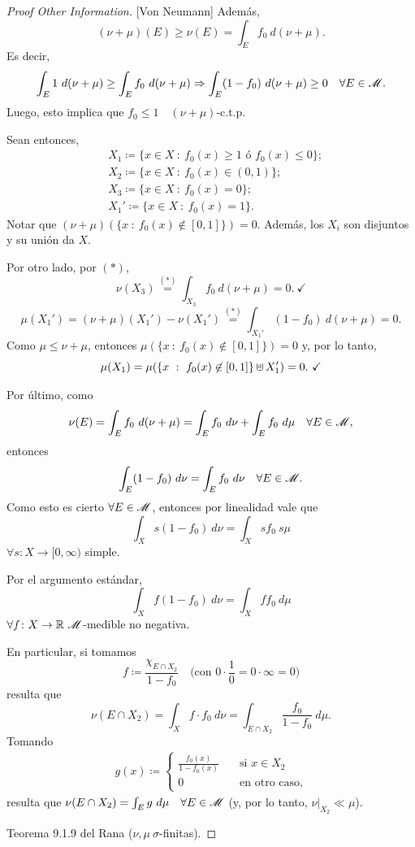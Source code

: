 \begin{proof}[Proof Other Information][Von Neumann]
	Además, 
	\[ (\nu + \mu)(E) \geq \nu(E) = \int_{E} f_{0} \ d(\nu + \mu). \]
	Es decir,
	\[ \int_{E} 1 \ d(\nu + \mu) \geq \int_{E} f_{0} \ d(\nu + \mu) \Rightarrow \int_{E} (1 - f_{0}) \ d(\nu + \mu) \geq 0 \quad \forall E \in \mathscr{M}. \]
	Luego, esto implica que $f_{0} \leq 1 \quad (\nu + \mu)$-c.t.p. \par
	Sean entonces, 
	\begin{align*}
		& X_{1} \coloneq \{x \in X \ : \ f_{0}(x) \geq 1 \text{ ó } f_{0}(x) \leq 0\}; \\
		& X_{2} \coloneq \{x \in X \ : \ f_{0}(x) \in (0,1)\}; \\
		& X_{3} \coloneq \{x \in X \ : \ f_{0}(x) = 0\}; \\
		& X_{1}' \coloneq \{x \in X \ : \ f_{0}(x) = 1\}  
	.\end{align*}
	Notar que $(\nu + \mu)(\{x \ : \ f_{0}(x) \not\in [0,1]\}) = 0$. Además, los $X_{i}$ son disjuntos y su unión da $X$. \par
	Por otro lado, por $(*)$,
	\[ \nu(X_{3}) \stackrel{(*)}{=} \int_{X_{3}} f_{0} \ d(\nu + \mu) = 0. \ \checkmark \]
	\[ \mu(X_{1}') = (\nu + \mu)(X_{1}') - \nu(X_{1}') \stackrel{(*)}{=} \int_{X_{1}'} (1 - f_{0}) \ d(\nu + \mu) = 0. \]
	Como $\mu \leq \nu + \mu$, entonces $\mu(\{x \ : \ f_{0}(x) \not\in [0,1]\}) = 0$ y, por lo tanto,
	\[ \mu(X_{1}) = \mu(\{x \ : \ f_{0}(x) \not\in [0,1]\} \cupd X_{1}') = 0. \ \checkmark \] 
	\par
	Por último, como
	\[ \nu(E) = \int_{E} f_{0} \ d(\nu + \mu) = \int_{E} f_{0} \ d\nu + \int_{E} f_{0} \ d\mu \quad \forall E \in \mathscr{M}, \]
	entonces
	\[ \int_{E} (1 - f_{0}) \ d\nu = \int_{E} f_{0} \ d\nu \quad \forall E \in \mscr{M}. \]
	Como esto es cierto $\forall E \in \mathscr{M}$, entonces por linealidad vale que
	\[ \int_{X} s(1 - f_{0}) \ d\nu = \int_{X} sf_{0} \ s\mu \]
	$\forall s \colon X \to [0,\infty)$ simple. \par
	Por el argumento estándar,
	\[ \int_{X} f(1 - f_{0}) \ d\nu = \int_{X} f f_{0} \ d\mu \]
	$\forall f \colon X \to \R \ \mscr{M}$-medible no negativa. \par
	En particular, si tomamos
	\[ f \coloneq \frac{\chi_{E \cap X_{2}}}{1 - f_{0}} \quad \Big(\text{con } 0 \cdot \frac{1}{0} = 0 \cdot \infty = 0 \Big) \]
	resulta que
	\[ \nu(E \cap X_{2}) = \int_{X} f \cdot f_{0} \ d\nu = \int_{E \cap X_{2}} \frac{f_{0}}{1 - f_{0}} \ d\mu. \]
	Tomando
	\begin{align*}
		g(x) \coloneq \begin{cases}
			\frac{f_{0}(x)}{1 - f_{0}(x)} \quad & \text{si } x \in X_{2} \\
			0 \quad & \text{en otro caso,}
		\end{cases}
	\end{align*}
	resulta que $\nu(E \cap X_{2}) = \int_{E} g \ d\mu \quad \forall E \in \mathscr{M}$ (y, por lo tanto, $\nu|_{X_{2}} \ll \mu$). \par
	 Teorema 9.1.9 del Rana ($\nu,\mu \ \sigma$-finitas).
\end{proof}

